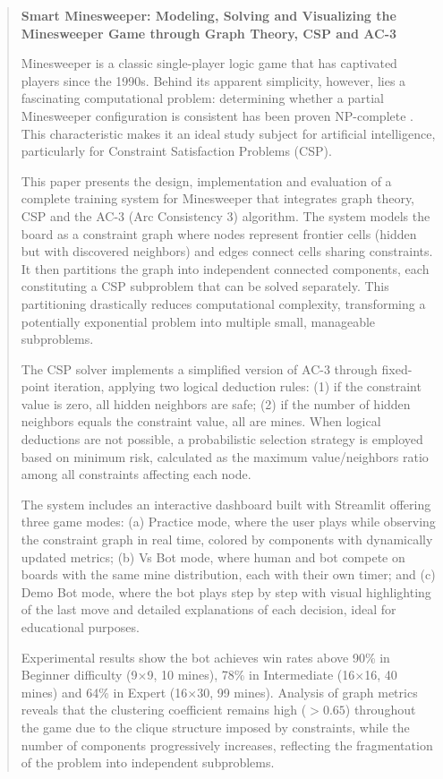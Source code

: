 \documentclass[12pt,a4paper]{article}
\begin{document}
\begin{abstract}
\noindent\textbf{Smart Minesweeper: Modeling, Solving and Visualizing the Minesweeper Game through Graph Theory, CSP and AC-3}

\medskip
\noindent Minesweeper is a classic single-player logic game that has captivated players since the 1990s. Behind its apparent simplicity, however, lies a fascinating computational problem: determining whether a partial Minesweeper configuration is consistent has been proven NP-complete \cite{kaye2000minesweeper}. This characteristic makes it an ideal study subject for artificial intelligence, particularly for Constraint Satisfaction Problems (CSP).

This paper presents the design, implementation and evaluation of a complete training system for Minesweeper that integrates graph theory, CSP and the AC-3 (Arc Consistency 3) algorithm. The system models the board as a constraint graph where nodes represent frontier cells (hidden but with discovered neighbors) and edges connect cells sharing constraints. It then partitions the graph into independent connected components, each constituting a CSP subproblem that can be solved separately. This partitioning drastically reduces computational complexity, transforming a potentially exponential problem into multiple small, manageable subproblems.

The CSP solver implements a simplified version of AC-3 through fixed-point iteration, applying two logical deduction rules: (1) if the constraint value is zero, all hidden neighbors are safe; (2) if the number of hidden neighbors equals the constraint value, all are mines. When logical deductions are not possible, a probabilistic selection strategy is employed based on minimum risk, calculated as the maximum value/neighbors ratio among all constraints affecting each node.

The system includes an interactive dashboard built with Streamlit offering three game modes: (a) Practice mode, where the user plays while observing the constraint graph in real time, colored by components with dynamically updated metrics; (b) Vs Bot mode, where human and bot compete on boards with the same mine distribution, each with their own timer; and (c) Demo Bot mode, where the bot plays step by step with visual highlighting of the last move and detailed explanations of each decision, ideal for educational purposes.

Experimental results show the bot achieves win rates above 90\% in Beginner difficulty (9$\times$9, 10 mines), 78\% in Intermediate (16$\times$16, 40 mines) and 64\% in Expert (16$\times$30, 99 mines). Analysis of graph metrics reveals that the clustering coefficient remains high ($>0.65$) throughout the game due to the clique structure imposed by constraints, while the number of components progressively increases, reflecting the fragmentation of the problem into independent subproblems.


\end{abstract}
\end{document}
